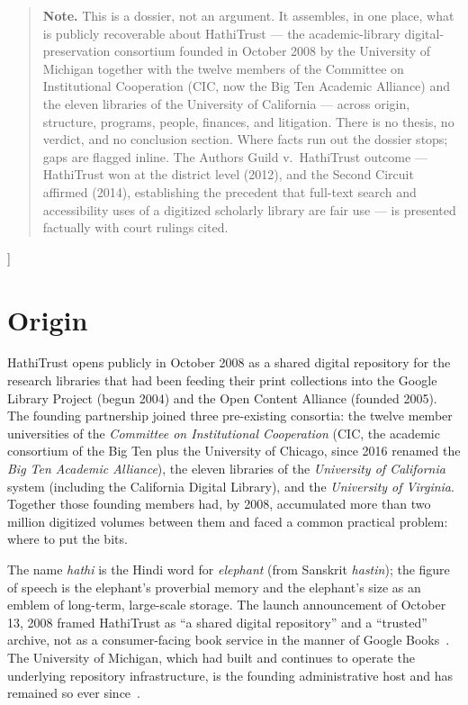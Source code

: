 \documentclass[10pt,letterpaper,twocolumn]{article}
\begin{document}
{\begin{quote}
\small\noindent\textbf{Note.} This is a dossier, not an argument. It assembles, in one place, what is publicly recoverable about HathiTrust --- the academic-library digital-preservation consortium founded in October 2008 by the University of Michigan together with the twelve members of the Committee on Institutional Cooperation (CIC, now the Big Ten Academic Alliance) and the eleven libraries of the University of California --- across origin, structure, programs, people, finances, and litigation. There is no thesis, no verdict, and no conclusion section. Where facts run out the dossier stops; gaps are flagged inline. The Authors Guild v.~HathiTrust outcome --- HathiTrust won at the district level (2012), and the Second Circuit affirmed (2014), establishing the precedent that full-text search and accessibility uses of a digitized scholarly library are fair use --- is presented factually with court rulings cited.
\end{quote}
\vspace{0.5em}
}]

\section{Origin}

HathiTrust opens publicly in October 2008 as a shared digital repository for the research libraries that had been feeding their print collections into the Google Library Project (begun 2004) and the Open Content Alliance (founded 2005). The founding partnership joined three pre-existing consortia: the twelve member universities of the \emph{Committee on Institutional Cooperation} (CIC, the academic consortium of the Big Ten plus the University of Chicago, since 2016 renamed the \emph{Big Ten Academic Alliance}), the eleven libraries of the \emph{University of California} system (including the California Digital Library), and the \emph{University of Virginia}. Together those founding members had, by 2008, accumulated more than two million digitized volumes between them and faced a common practical problem: where to put the bits.

The name \emph{hathi} is the Hindi word for \emph{elephant} (from Sanskrit \emph{hastin}); the figure of speech is the elephant's proverbial memory and the elephant's size as an emblem of long-term, large-scale storage. The launch announcement of October 13, 2008 framed HathiTrust as ``a shared digital repository'' and a ``trusted'' archive, not as a consumer-facing book service in the manner of Google Books~\citep{cdl2008launch,um2008launch}. The University of Michigan, which had built and continues to operate the underlying repository infrastructure, is the founding administrative host and has remained so ever since~\citep{wikipediahathi}.
\end{document}
